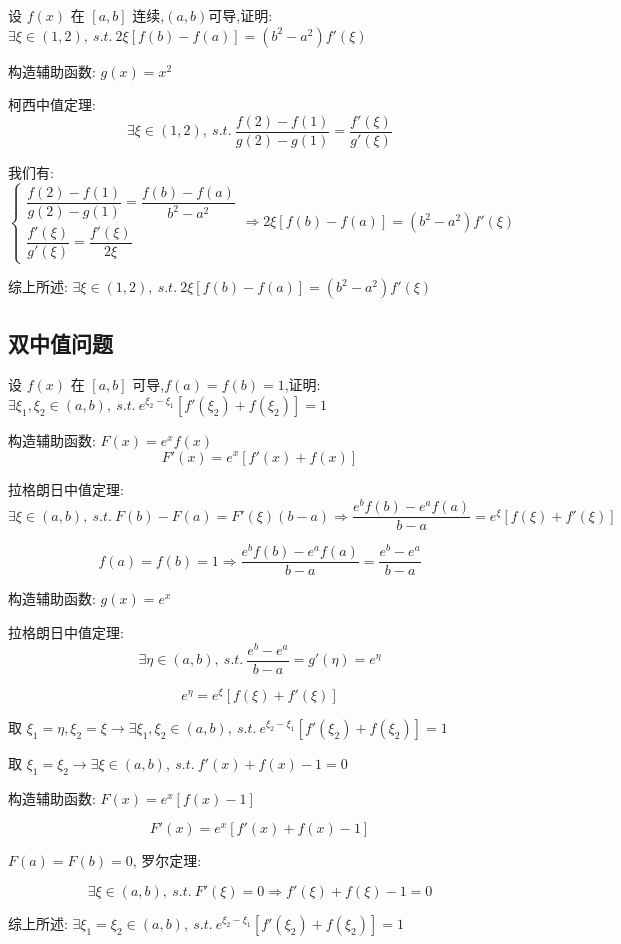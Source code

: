 \begin{proposition}
	设 $f(x)$ 在 $[a,b]$ 连续,$(a,b)$可导,证明: $\exists \xi\in(1,2),\ s.t.\ 2\xi[f(b)-f(a)]=(b^2-a^2)f'(\xi)$
\end{proposition}
\begin{solution}

	构造辅助函数: $g(x)=x^2$

	柯西中值定理:
	$$\exists\xi\in(1,2),\ s.t.\ \dfrac{f(2)-f(1)}{g(2)-g(1)}=\dfrac{f'(\xi)}{g'(\xi)}$$

	我们有:
	$$\begin{cases}
		\dfrac{f(2)-f(1)}{g(2)-g(1)}=\dfrac{f(b)-f(a)}{b^2-a^2} \\
		\dfrac{f'(\xi)}{g'(\xi)}=\dfrac{f'(\xi)}{2\xi}
	\end{cases} \Rightarrow 2\xi[f(b)-f(a)]=(b^2-a^2)f'(\xi)$$

	综上所述: $\exists \xi\in(1,2),\ s.t.\ 2\xi[f(b)-f(a)]=(b^2-a^2)f'(\xi)$
\end{solution}

\subsection{双中值问题}

\begin{proposition}
	设 $f(x)$ 在 $[a,b]$ 可导,$f(a)=f(b)=1$,证明: $\exists \xi_{1},\xi_{2}\in(a,b),\ s.t.\ e^{\xi_{2}-\xi_{1}}[f'(\xi_{2})+f(\xi_{2})]=1$
\end{proposition}
\begin{solution}

	构造辅助函数: $F(x)=e^xf(x)$
	$$F'(x)=e^x[f'(x)+f(x)]$$

	拉格朗日中值定理:
	$$\exists\xi\in(a,b),\ s.t.\ F(b)-F(a)=F'(\xi)(b-a)\Rightarrow \dfrac{e^bf(b)-e^af(a)}{b-a}=e^{\xi}[f(\xi)+f'(\xi)]$$

	$$f(a)=f(b)=1\Rightarrow \dfrac{e^bf(b)-e^af(a)}{b-a}=\dfrac{e^b-e^a}{b-a}$$

	构造辅助函数: $g(x)=e^x$

	拉格朗日中值定理:
	$$\exists\eta\in(a,b),\ s.t.\ \dfrac{e^b-e^a}{b-a}=g'(\eta)=e^{\eta}$$

	$$e^{\eta}=e^{\xi}[f(\xi)+f'(\xi)]$$

	取 $\xi_{1}=\eta,\xi_{2}=\xi\to \exists \xi_{1},\xi_{2}\in(a,b),\ s.t.\ e^{\xi_{2}-\xi_{1}}[f'(\xi_{2})+f(\xi_{2})]=1$
\end{solution}
\begin{anymark}[注]
	取 $\xi_{1}=\xi_{2}\to \exists\xi\in(a,b),\ s.t.\ f'(x)+f(x)-1=0$

	构造辅助函数: $F(x)=e^x[f(x)-1]$

	$$F'(x)=e^{x}[f'(x)+f(x)-1]$$

	$F(a) = F(b) = 0$, 罗尔定理:

	$$\exists\xi\in(a,b),\ s.t.\ F'(\xi)=0\Rightarrow f'(\xi)+f(\xi)-1=0$$

	综上所述: $\exists \xi_{1}=\xi_{2}\in(a,b),\ s.t.\ e^{\xi_{2}-\xi_{1}}[f'(\xi_{2})+f(\xi_{2})]=1$
\end{anymark}

